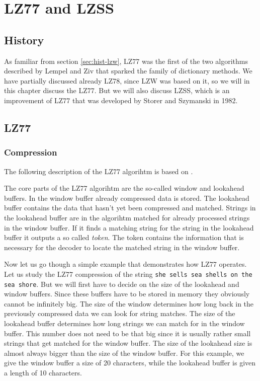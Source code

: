 \begin{comment}
  
\end{comment}

\chapter{LZ77 and LZSS}
\label{cha:lz77-lzss}

\section{History}

As familiar from section \ref{sec:hist-lzw}, LZ77 was the first of the
two algorithms described by Lempel and Ziv that sparked the family of
dictionary methods. We have partially discussed already LZ78, since
LZW was based on it, so we will in this chapter discuss the LZ77. But
we will also discuss LZSS, which is an improvement of LZ77 that was
developed by Storer and Szymanski in 1982.

\section{LZ77}

\subsection{Compression}

The following description of the LZ77 algorihtm is based on
\cite{Salomon:2004:DCC,mark1996data_compression_book,mcfadden92:_hackin_data_compr_ziv_lempel}.

The core parts of the LZ77 algorihtm are the so-called window and
lookahead buffers. In the window buffer already compressed data is
stored. The lookahead buffer contains the data that hasn't yet been
compressed and matched. Strings in the lookahead buffer are in the
algorihtm matched for already processed strings in the window
buffer. If it finds a matching string for the string in the lookahead
buffer it outputs a so called \textit{token}. The token contains the
information that is necessary for the decoder to locate the matched
string in the window buffer.

Now let us go though a simple example that demonstrates how LZ77
operates. Let us study the LZ77 compression of the string \texttt{she
  sells sea shells on the sea shore}. But we will first have to decide
on the size of the lookahead and window buffers. Since these buffers
have to be stored in memory they obviously cannot be infinitely
big. The size of the window determines how long back in the previously
compressed data we can look for string matches. The size of the
lookahead buffer determines how long strings we can match for in the
window buffer. This number does not need to be that big since it is
usually rather small strings that get matched for the window
buffer. The size of the lookahead size is almost always bigger than
the size of the window buffer. For this example, we give the window
buffer a size of 20 characters, while the lookahead buffer is given a
length of 10 characters.

